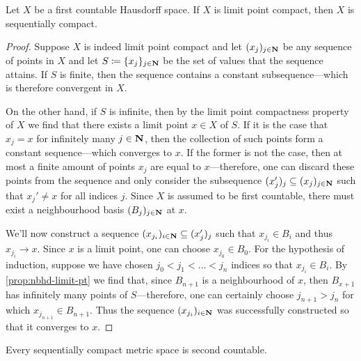 \begin{lemma}
\label{lem:fst-countable-hausdorff-limit-pt-implies-seq-comp}
Let \(X\) be a first countable Hausdorff space. If \(X\) is limit point compact,
then \(X\) is sequentially compact.
\end{lemma}

\begin{proof}
Suppose \(X\) is indeed limit point compact and let \((x_j)_{j \in \mathbf{N}}\) be any
sequence of points in \(X\) and let \(S \coloneq \{x_j\}_{j \in \mathbf{N}}\) be the
set of values that the sequence attains. If \(S\) is finite, then the sequence
contains a constant subsequence---which is therefore convergent in \(X\).

On the other hand, if \(S\) is infinite, then by the limit point compactness
property of \(X\) we find that there exists a limit point \(x \in X\) of
\(S\). If it is the case that \(x_j = x\) for infinitely many \(j \in \mathbf{N}\), then
the collection of such points form a constant sequence---which converges to
\(x\). If the former is not the case, then at most a finite amount of points
\(x_j\) are equal to \(x\)---therefore, one can discard these points from the
sequence and only consider the subsequence
\((x_j')_j \subseteq (x_j)_{j \in \mathbf{N}}\) such that \(x_j' \neq x\) for all
indices \(j\). Since \(X\) is assumed to be first countable, there must exist a
neighbourhood basis \((B_j)_{j \in \mathbf{N}}\) at \(x\).

We'll now construct a sequence \((x_{j_i})_{i \in \mathbf{N}} \subseteq (x_j')_j\) such
that \(x_{j_i} \in B_i\) and thus \(x_{j_i} \to x\). Since \(x\) is a limit
point, one can choose \(x_{j_0} \in B_0\). For the hypothesis of induction,
suppose we have chosen \(j_0 < j_1 < \dots < j_n\) indices so that
\(x_{j_i} \in B_i\). By \cref{prop:nbhd-limit-pt} we find that, since
\(B_{n + 1}\) is a neighbourhood of \(x\), then \(B_{x + 1}\) has infinitely
many points of \(S\)---therefore, one can certainly choose \(j_{n+1} > j_n\) for
which \(x_{j_{n+1}} \in B_{n+1}\). Thus the sequence \((x_{j_i})_{i \in \mathbf{N}}\)
was successfully constructed so that it converges to \(x\).
\end{proof}

\begin{lemma}
\label{lem:metric-sequencially-comp-is-2nd-ctbl}
Every sequentially compact metric space is second countable.
\end{lemma}

